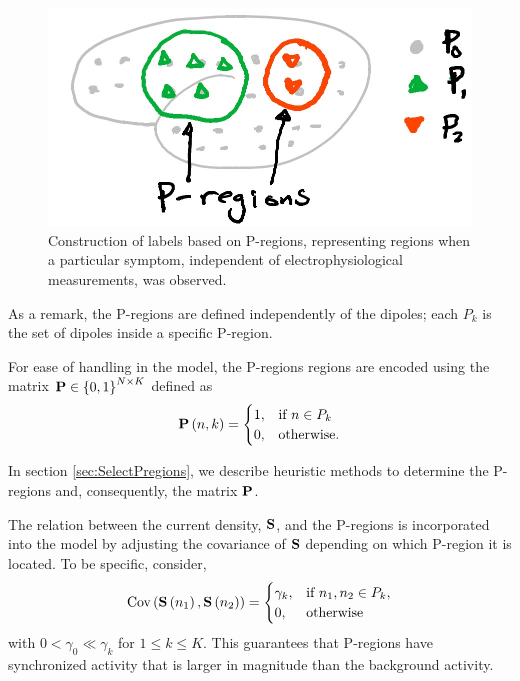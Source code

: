 \begin{figure}
    \centering 
    \includegraphics[width=0.6\linewidth]{./img_dev/Pregions.jpg}
    \caption{Construction of labels based on P-regions, representing regions when a particular symptom, independent of electrophysiological measurements, was observed.}
\end{figure}

As a remark, the P-regions are defined independently of the dipoles; each $P_k$ is the set of dipoles inside a specific P-region.

For ease of handling in the model, the P-regions regions are encoded using the matrix 
$\mathbf{P}\in \left\{ 0,1 \right\}^{N\times K}$ defined as
\begin{equation}
    \mathbf{P}\left( n,k \right) = \begin{cases}
        1, &\text{if } n \in P_k \\
        0, &\text{otherwise.}
    \end{cases}
\end{equation}

In section \ref{sec:SelectPregions}, we describe heuristic methods to determine the P-regions and, consequently, the matrix $\mathbf{P}$.



The relation between the current density, $\mathbf{S}$, and the P-regions is incorporated into the model by adjusting the covariance of $\mathbf{S}$ depending on which P-region it is located.
%
To be specific, consider,
\begin{equation}
    \text{Cov}\left( \mathbf{S}\left( n_1 \right), \mathbf{S}\left( n_2 \right) \right) = 
    \begin{cases}
        \gamma_k, & \text{if } n_1, n_2\in P_k, \\
        0, & \text{otherwise}
    \end{cases}
\end{equation}
with $0 < \gamma_0 \ll \gamma_k$ for $1\leq k \leq K$.
%
This guarantees that P-regions have synchronized activity that is larger in magnitude than the background activity.

